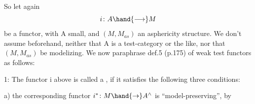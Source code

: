 So let again
\[ i\colon A \hand{\longrightarrow} M \]
be a functor,  with A small,  and $(M,M_{as})$ an  asphericity structure.  We
don't  assume beforehand,  neither that A is a test-category or the like,
nor that $(M,M_{as})$ be modelizing.  We now paraphrase def.5  (p.175) of
weak test functors as follows:

\hand{\uline{\textcolor{black}{Definition}}} 1:  The functor i above is called a  \hand{\uline{\textcolor{black}{functor}}} ,
if it satisfies the following three conditions:

a)  the corresponding functor  $i^{*}\colon M \hand{\to} A^\wedge$ is ``model-preserving'',  by

